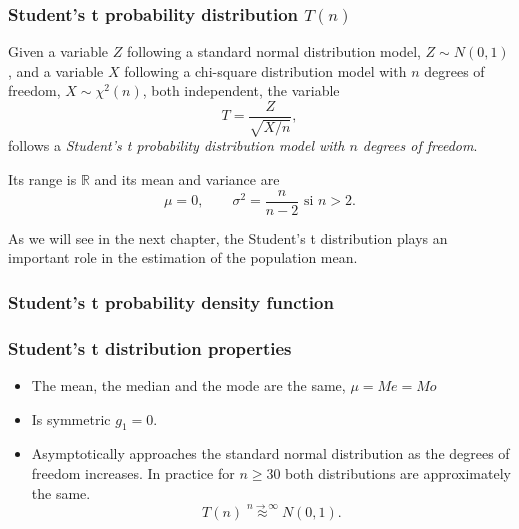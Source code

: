 \begin{frame}
\frametitle{Student's t probability distribution $T(n)$}
\begin{definition}
Given a variable $Z$ following a standard normal distribution model, $Z\sim N(0,1)$, and a variable $X$ following a
chi-square distribution model with $n$ degrees of freedom, $X\sim \chi^2(n)$,  both independent, the variable 
\[
T = \frac{Z}{\sqrt{X/n}},
\]
follows a \emph{Student's t probability distribution model with $n$ degrees of freedom}.
\end{definition}

Its range is $\mathbb{R}$ and its mean and variance are
\[
\mu = 0, \qquad \sigma^2 = \frac{n}{n-2} \mbox{ si $n>2$}.
\]

As we will see in the next chapter, the Student's t distribution plays an important role in the estimation of the
population mean.
\end{frame}


\begin{frame}
\frametitle{Student's t probability density function}

\begin{center}
\end{center}
\end{frame}


\begin{frame}
\frametitle{Student's t distribution properties}
\begin{itemize}
\item The mean, the median and the mode are the same, $\mu=Me=Mo$
\item Is symmetric $g_1=0$.
\item Asymptotically approaches the standard normal distribution as the degrees of freedom increases. 
In practice for $n\geq 30$ both distributions are approximately the same. 
\[
T(n)\stackrel{n\rightarrow \infty}{\approx}N(0,1).
\]
\end{itemize}
\end{frame}


